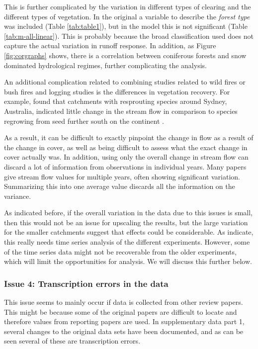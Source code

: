 \documentclass[]{elsarticle} %
\begin{document}
This is further complicated by the variation in different types of clearing and the different types of vegetation. In the original \citet{zhang2017} a variable to describe the \emph{forest type} was included (Table \ref{tab:table1}), but in the model this is not significant (Table \ref{tab:m-all-linear}). This is probably because the broad classification used does not capture the actual variation in runoff response. In addition, as Figure \ref{fig:corgraphs} shows, there is a correlation between coniferous forests and snow dominated hydrological regimes, further complicating the analysis.

An additional complication related to combining studies related to wild fires or bush fires and logging studies is the differences in vegetation recovery. For example, \citet{heath2014} found that catchments with resprouting species around Sydney, Australia, indicated little change in the stream flow in comparison to species regrowing from seed further south on the continent \citep{zhou2015bushfire}.

As a result, it can be difficult to exactly pinpoint the change in flow as a result of the change in cover, as well as being difficult to assess what the exact change in cover actually was. In addition, using only the overall change in stream flow can discard a lot of information from observations in individual years. Many papers give stream flow values for multiple years, often showing significant variation. Summarizing this into one average value discards all the information on the variance.

As indicated before, if the overall variation in the data due to this issues is small, then this would not be an issue for upscaling the results, but the large variation for the smaller catchments suggest that effects could be considerable. As \citet{jones2017} indicate, this really needs time series analysis of the different experiments. However, some of the time series data might not be recoverable from the older experiments, which will limit the opportunities for analysis. We will discuss this further below.

\hypertarget{issue-4-transcription-errors-in-the-data}{%
\subsubsection{Issue 4: Transcription errors in the data}\label{issue-4-transcription-errors-in-the-data}}

This issue seems to mainly occur if data is collected from other review papers. This might be because some of the original papers are difficult to locate and therefore values from reporting papers are used. In supplementary data part 1, several changes to the original data sets have been documented, and as can be seen several of these are transcription errors.
\end{document}
